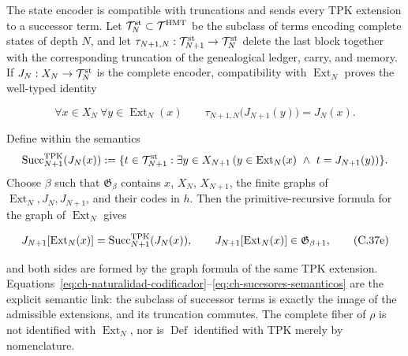 The state encoder is compatible with truncations and sends every TPK extension
to a successor term. Let
\(\mathcal T_N^{\rm st}\subset\mathcal T^{\rm HMT}\) be the subclass of terms
encoding complete states of depth \(N\), and let
\(\tau_{N+1,N}:\mathcal T_{N+1}^{\rm st}\to\mathcal T_N^{\rm st}\) delete the
last block together with the corresponding truncation of the genealogical
ledger, carry, and memory. If \(J_N:X_N\to\mathcal T_N^{\rm st}\) is the
complete encoder, compatibility with \(\operatorname{Ext}_N\) proves the
well-typed identity

\[
 \forall x\in X_N\ \forall y\in\operatorname{Ext}_N(x)\qquad
 \tau_{N+1,N}\bigl(J_{N+1}(y)\bigr)=J_N(x).
\tag{C.37e$_0$}\label{eq:ch-naturalidad-codificador}
\]

Define within the semantics
\[
 \operatorname{Succ}^{\rm TPK}_{N+1}(J_N(x)):=
 \{t\in\mathcal T_{N+1}^{\rm st}:\exists y\in X_{N+1}\,
   (y\in\operatorname{Ext}_N(x)\ \wedge\ t=J_{N+1}(y))\}.
\]
Choose \(\beta\) such that \(\mathfrak G_\beta\) contains \(x\), \(X_N\),
\(X_{N+1}\), the finite graphs of
\(\operatorname{Ext}_N,J_N,J_{N+1}\), and their codes in \(h\). Then the
primitive-recursive formula for the graph of \(\operatorname{Ext}_N\) gives

\[
 J_{N+1}[\operatorname{Ext}_N(x)]
 =\operatorname{Succ}^{\rm TPK}_{N+1}(J_N(x)),
 \qquad
 J_{N+1}[\operatorname{Ext}_N(x)]
 \in\mathfrak G_{\beta+1},
\tag{C.37e}\label{eq:ch-sucesores-semanticos}
\]

and both sides are formed by the graph formula of the same TPK extension.
Equations~\eqref{eq:ch-naturalidad-codificador}--\allowbreak\eqref{eq:ch-sucesores-semanticos}
are the explicit semantic link: the subclass of successor terms is exactly the
image of the admissible extensions, and its truncation commutes. The complete
fiber of \(\rho\) is not identified with \(\operatorname{Ext}_N\), nor is
\(\operatorname{Def}\) identified with TPK merely by nomenclature.

